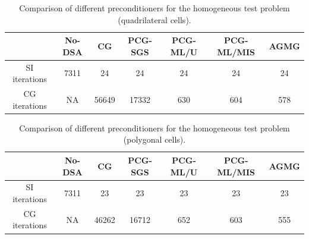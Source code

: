 \documentclass[preprint,10pt]{elsarticle}
\renewcommand{\(}{\left(}
\renewcommand{\)}{\right)}
\renewcommand{\[}{\left[}
\renewcommand{\]}{\right]}
\begin{document}
%
%
\begin{table}[!htbp]
  \begin{center}
    \caption{Comparison of different preconditioners for the homogeneous test problem (quadrilateral cells).}
    \begin{tabular}{|c|c|c|c|c|c|c|}
      \hline
      & No-DSA & CG & PCG-SGS & PCG-ML/U & PCG-ML/MIS & AGMG \\
      \hline
      SI iterations   & 7311    & 24      & 24       & 24      & 24      & 24 \\
      CG iterations   & NA      & 56649   & 17332    & 630     & 604     & 578 \\
      \hline
    \end{tabular}
    \label{comparison_homog_quad}
  \end{center}
\end{table}
%
\begin{table}[!htbp]
  \begin{center}
    \caption{Comparison of different preconditioners for the homogeneous test problem (polygonal cells).}
    \begin{tabular}{|c|c|c|c|c|c|c|}
      \hline
      & No-DSA & CG & PCG-SGS & PCG-ML/U & PCG-ML/MIS & AGMG \\
      \hline
      SI iterations   & 7311    & 23      & 23      & 23      & 23      & 23 \\
      CG iterations   & NA      & 46262   & 16712   & 652     & 603     & 555 \\
      \hline
    \end{tabular}
    \label{comparison_homog_poly}
  \end{center}
\end{table}
\end{document}
